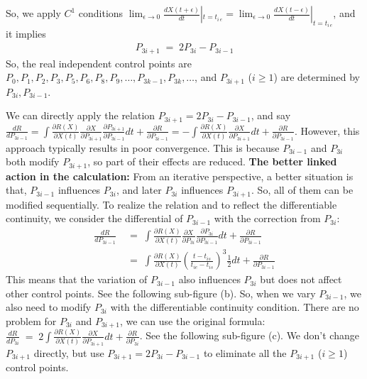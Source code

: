 \documentclass[12pt]{article}
\begin{document}
So, we apply $C^1$ conditions $\lim_{\epsilon\to 0}\frac{d X(t+\epsilon)}{dt} |_{t=t_{i\,e}} = \lim_{\epsilon\to 0}\frac{d X(t-\epsilon)}{dt} |_{t=t_{i\,e}}$, and it implies
%
\begin{align}
	P_{3i+1} \;=\; 2P_{3i} - P_{3i-1}
\end{align}
%
So, the real independent control points are $P_0,P_1,P_2,P_3,P_5,P_6,P_8,P_9,\dots,P_{3k-1},P_{3k},\dots$, and $P_{3i+1}$ ($i\ge 1$) are determined by $P_{3i}, P_{3i-1}$.


We can directly apply the relation $P_{3i+1} = 2P_{3i} - P_{3i-1}$, and say $\frac{d R}{d P_{3i-1}} = \int \frac{\partial R(X)}{\partial X(t)} \frac{\partial X}{\partial P_{3i+1}} \frac{\partial P_{3i+1}}{\partial P_{3i-1}} dt + \frac{\partial R}{\partial P_{3i-1}} = - \int \frac{\partial R(X)}{\partial X(t)} \frac{\partial X}{\partial P_{3i+1}} dt + \frac{\partial R}{\partial P_{3i-1}}$.
However, this approach typically results in poor convergence.
This is because $P_{3i-1}$ and $P_{3i}$ both modify $P_{3i+1}$, so part of their effects are reduced.
\textbf{The better linked action in the calculation:}
From an iterative perspective, a better situation is that, $P_{3i-1}$ influences $P_{3i}$, and later $P_{3i}$ influences $P_{3i+1}$.
So, all of them can be modified sequentially.
To realize the relation and to reflect the differentiable continuity, we consider the differential of $P_{3i-1}$ with the correction from $P_{3i}$:
%
\begin{align*}
	\frac{d R}{d P_{3i-1}} & \;=\; \int \frac{\partial R(X)}{\partial X(t)} \frac{\partial X}{\partial P_{3i}}\frac{\partial P_{3i}}{\partial P_{3i-1}} dt + \frac{\partial R}{\partial P_{3i-1}} \\
	& \;=\; \int \frac{\partial R(X)}{\partial X(t)} \left( \frac{t-t_{is}}{t_{ie}-t_{is}} \right)^3 \frac{1}{2} dt + \frac{\partial R}{\partial P_{3i-1}}
\end{align*}
%
This means that the variation of $P_{3i-1}$ also influences $P_{3i}$ but does not affect other control points.
See the following sub-figure (b).
So, when we vary $P_{3i-1}$, we also need to modify $P_{3i}$ with the differentiable continuity condition.
There are no problem for $P_{3i}$ and $P_{3i+1}$, we can use the original formula: $\frac{d R}{d P_{3i}} \;=\; 2\int \frac{\partial R(X)}{\partial X(t)}\frac{\partial X}{\partial P_{3i+1}} dt + \frac{\partial R}{\partial P_{3i}}$.
See the following sub-figure (c).
We don't change $P_{3i+1}$ directly, but use $P_{3i+1} = 2P_{3i} - P_{3i-1}$ to eliminate all the $P_{3i+1}$ ($i\ge 1$) control points.
\end{document}
